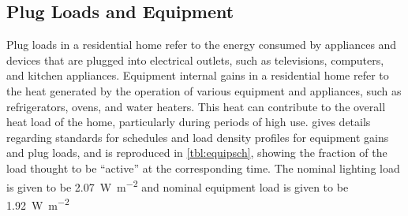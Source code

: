 \subsection{Plug Loads and Equipment}
Plug loads in a residential home refer to the energy consumed by appliances and devices that are plugged into electrical outlets, such as televisions, computers, and kitchen appliances. Equipment internal gains in a residential home refer to the heat generated by the operation of various equipment and appliances, such as refrigerators, ovens, and water heaters. This heat can contribute to the overall heat load of the home, particularly during periods of high use.  gives details regarding standards for schedules and load density profiles for equipment gains and plug loads, and is reproduced in \cref{tbl:equipsch}, showing the fraction of the load thought to be ``active'' at the corresponding time. The nominal lighting load is given to be \qty{2.07}{\watt\per\square\meter} and nominal equipment load is given to be \qty{1.92}{\watt\per\square\meter}

